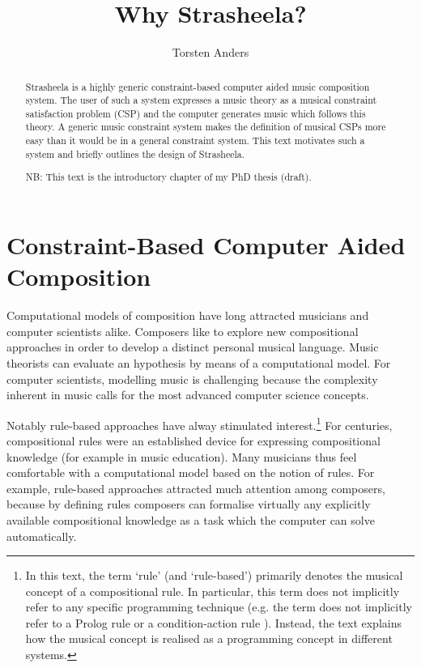 \documentclass{scrartcl}
\begin{document}
\title{Why Strasheela?}
\author{Torsten Anders}
\maketitle

\begin{abstract}

Strasheela is a highly generic constraint-based computer aided music composition system. The user of such a system expresses a music theory as a musical constraint satisfaction problem (CSP) and the computer generates music which follows this theory. A generic music constraint system makes the definition of musical CSPs more easy than it would be in a general constraint system. This text motivates such a system and briefly outlines the design of Strasheela.

NB: This text is the introductory chapter of my PhD thesis (draft).   

\end{abstract}


\section{Constraint-Based Computer Aided Composition}

Computational models of composition have long attracted musicians and computer scientists alike. Composers like to explore new compositional approaches in order to develop a distinct personal musical language. Music theorists can evaluate an hypothesis by means of a computational model. For computer scientists, modelling music is challenging because the complexity inherent in music calls for the most advanced computer science concepts.

Notably rule-based approaches have alway stimulated interest.\footnote{In this text, the term `rule' (and `rule-based') primarily denotes the musical concept of a compositional rule. 
In particular, this term does not implicitly refer to any specific programming technique (e.g. the term does not implicitly refer to a Prolog rule \citep{Bratko:Prolog:2001} or a condition-action rule \citep{RussellAndNorvig:AI}). 
Instead, the text explains how the musical concept is realised as a programming concept in different systems.} 
For centuries, compositional rules were an established device for expressing compositional knowledge (for example in music education). Many musicians thus feel comfortable with a computational model based on the notion of rules. For example, rule-based approaches attracted much attention among composers, because by defining rules composers can formalise virtually any explicitly available compositional knowledge as a task which the computer can solve automatically.
\end{document}
